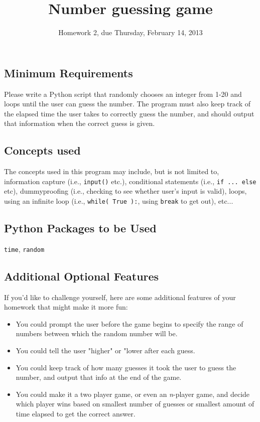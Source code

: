 \documentclass[11pt]{amsart}
\title{Number guessing game }
\author{Homework 2, due Thursday, February 14, 2013}
\begin{document}
\maketitle

\subsection*{Minimum Requirements}
Please write a Python script that randomly chooses an integer from 1-20 and loops until the user can guess the number. The program must also keep track of the elapsed time the user takes to correctly guess the number, and should output that information when the correct guess is given.

\subsection*{Concepts used}
The concepts used in this program may include, but is not limited to, information capture (i.e., \texttt{input()} etc.), conditional statements (i.e., \texttt{if ... else} etc), dummyproofing (i.e., checking to see whether user's input is valid), loops, using an infinite loop (i.e., \texttt{while( True ):}, using \texttt{break} to get out), etc...

\subsection*{Python Packages to be Used}
\texttt{time}, \texttt{random}

\subsection*{Additional Optional Features}
If you'd like to challenge yourself, here are some additional features of your homework that might make it more fun:
\begin{itemize}
	\item You could prompt the user before the game begins to specify the range of numbers between which the random number will be.
	\item You could tell the user "higher" or "lower after each guess.
	\item You could keep track of how many guesses it took the user to guess the number, and output that info at the end of the game.
	\item You could make it a two player game, or even an \emph{n}-player game, and decide which player wins based on smallest number of guesses or smallest amount of time elapsed to get the correct answer.
\end{itemize}
\end{document}

